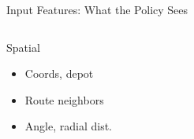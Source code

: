 \documentclass{beamer}
\newcommand{\highlight}[1]{\textcolor{myorange}{\textbf{#1}}}
\begin{document}
\begin{frame}{Input Features: What the Policy Sees}
  \begin{columns}[T]
%
    \begin{block}{Spatial}
      \small
      \begin{itemize}\itemsep1pt
        \item Coords, depot
        \item Route neighbors
        \item Angle, radial dist.
      \end{itemize}
    \end{block}


\end{columns}
\end{frame}
\end{document}
